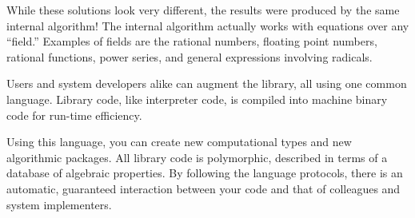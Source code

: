 %
%
%

While these solutions look very different, the results were
produced by the same internal algorithm!
The internal algorithm actually works with equations over any ``field.''
Examples of fields are the rational numbers, floating point
numbers, rational functions, power series, and general expressions
involving radicals.


Users and system developers alike can augment the \Language{}
library, all using one common language.
Library code, like interpreter code, is compiled into machine
binary code for run-time efficiency.

Using this language, you can create new computational types and
new algorithmic packages.
All library code is polymorphic, described in terms of a database
of algebraic properties.
By following the language protocols, there is an automatic,
guaranteed interaction between your code and that of colleagues
and system implementers.
